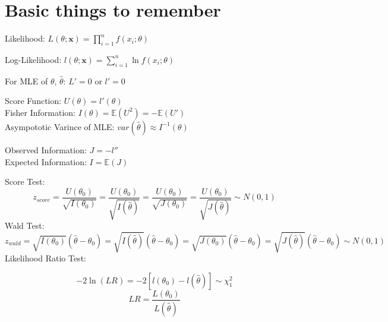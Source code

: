 \documentclass[a4paper]{article}
\begin{document}



\section*{Basic things to remember}
\begin{multicols}{2}
	\begin{center}
		Likelihood: $L(\theta; \mathbf{x}) = \prod_{i=1}^n f(x_i;\theta)$
	\end{center}
	\begin{center}
		Log-Likelihood: $l(\theta; \mathbf{x}) = \sum_{i=1}^n \ln{f(x_i;\theta)}$
	\end{center}
\end{multicols}
	\begin{center}
		For MLE of $\theta$, $\hat{\theta}$: $L' = 0$ or $l' = 0$
	\end{center}
Score Function: $U(\theta) = l'(\theta)$\\
Fisher Information: $I(\theta) = \mathbb{E}(U^2) = -\mathbb{E}(U')$\\
Asympototic Varince of MLE: $var(\hat{\theta}) \approx I^{-1}(\theta)$
\begin{multicols}{2}
	\begin{center}
		Observed Information: $J = -l''$\\
		Expected Information: $I = \mathbb{E}(J)$
	\end{center}
\end{multicols}
Score Test: $$z_{score} = \frac{U(\theta_0)}{\sqrt{I(\theta_0)}} = \frac{U(\theta_0)}{\sqrt{I(\hat{\theta})}} = \frac{U(\theta_0)}{\sqrt{J(\theta_0)}} = \frac{U(\theta_0)}{\sqrt{J(\hat{\theta})}} \sim N(0,1)$$
Wald Test: $$z_{wald} = \sqrt{I(\theta_0)}(\hat{\theta} - \theta_0) = \sqrt{I(\hat{\theta})}(\hat{\theta} - \theta_0) = \sqrt{J(\theta_0)}(\hat{\theta} - \theta_0) = \sqrt{J(\hat{\theta})}(\hat{\theta} - \theta_0) \sim N(0,1)$$
Likelihood Ratio Test:
	\begin{multicols}{2}
		$$-2\ln(LR) = -2[l(\theta_0)-l(\hat{\theta})] \sim \chi_1^2$$
		$$LR = \frac{L(\theta_0)}{L({\hat{\theta}})}$$
	\end{multicols}
\end{document}
